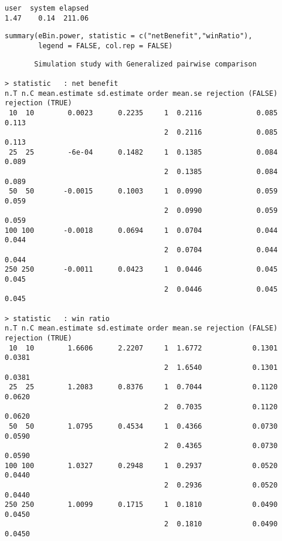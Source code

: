 \documentclass[12pt]{article}
\begin{document}
\begin{verbatim}
user  system elapsed 
1.47    0.14  211.06
\end{verbatim}

\lstset{language=r,label= ,caption= ,captionpos=b,numbers=none}
\begin{lstlisting}
summary(eBin.power, statistic = c("netBenefit","winRatio"), 
		legend = FALSE, col.rep = FALSE)
\end{lstlisting}

\begin{verbatim}
       Simulation study with Generalized pairwise comparison

> statistic   : net benefit
n.T n.C mean.estimate sd.estimate order mean.se rejection (FALSE) rejection (TRUE)
 10  10        0.0023      0.2235     1  0.2116             0.085            0.113
                                      2  0.2116             0.085            0.113
 25  25        -6e-04      0.1482     1  0.1385             0.084            0.089
                                      2  0.1385             0.084            0.089
 50  50       -0.0015      0.1003     1  0.0990             0.059            0.059
                                      2  0.0990             0.059            0.059
100 100       -0.0018      0.0694     1  0.0704             0.044            0.044
                                      2  0.0704             0.044            0.044
250 250       -0.0011      0.0423     1  0.0446             0.045            0.045
                                      2  0.0446             0.045            0.045

> statistic   : win ratio
n.T n.C mean.estimate sd.estimate order mean.se rejection (FALSE) rejection (TRUE)
 10  10        1.6606      2.2207     1  1.6772            0.1301           0.0381
                                      2  1.6540            0.1301           0.0381
 25  25        1.2083      0.8376     1  0.7044            0.1120           0.0620
                                      2  0.7035            0.1120           0.0620
 50  50        1.0795      0.4534     1  0.4366            0.0730           0.0590
                                      2  0.4365            0.0730           0.0590
100 100        1.0327      0.2948     1  0.2937            0.0520           0.0440
                                      2  0.2936            0.0520           0.0440
250 250        1.0099      0.1715     1  0.1810            0.0490           0.0450
                                      2  0.1810            0.0490           0.0450
\end{verbatim}
\end{document}
